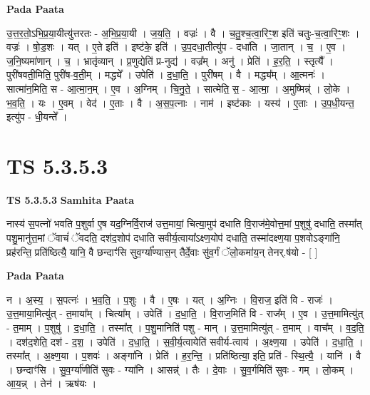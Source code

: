 \documentclass[17pt]{extarticle}
\begin{document}
\textbf{Pada Paata} \newline

उ॒त्त॒र॒तो॒ऽभि॒प्र॒या॒यीत्यु॑त्तरतः - अ॒भि॒प्र॒या॒यी । ज॒य॒ति॒ । वज्रः॑ । वै । च॒तु॒श्च॒त्वा॒रिꣳ॒॒श इति॑ चतुः-च॒त्वा॒रिꣳ॒॒शः । वज्रः॑ । षो॒ड॒शः । यत् । ए॒ते इति॑ । इष्ट॑के॒ इति॑ । उ॒प॒दधा॒तीत्यु॑प - दधा॑ति । जा॒तान् । च॒ । ए॒व । ज॒नि॒ष्यमा॑णान् । च॒ । भ्रातृ॑व्यान् । प्र॒णुद्येति॑ प्र-नुद्य॑ । वज्र᳚म् । अनु॑ । प्रेति॑ । ह॒र॒ति॒ । स्तृत्यै᳚ । पुरी॑षवती॒मिति॒ पुरी॑ष-व॒ती॒म् । मद्ध्ये᳚ । उपेति॑ । द॒धा॒ति॒ । पुरी॑षम् । वै । मद्ध्य᳚म् । आ॒त्मनः॑ । सात्मा॑न॒मिति॒ स - आ॒त्मा॒न॒म् । ए॒व । अ॒ग्निम् । चि॒नु॒ते॒ । सात्मेति॒ स॒ - आ॒त्मा॒ । अ॒मुष्मिन्न्॑ । लो॒के । भ॒व॒ति॒ । यः । ए॒वम् । वेद॑ । ए॒ताः । वै । अ॒स॒प॒त्नाः । नाम॑ । इष्ट॑काः । यस्य॑ । ए॒ताः । उ॒प॒धी॒यन्त॒ इत्यु॑प - धी॒यन्ते᳚ ।  \newline




\section*{ TS 5.3.5.3 }

\textbf{TS 5.3.5.3 } \newline
\textbf{Samhita Paata} \newline

नास्य॑ स॒पत्नो॑ भवति प॒शुर्वा ए॒ष यद॒ग्निर्वि॒राज॑ उत्त॒मायां॒ चित्या॒मुप॑ दधाति वि॒राज॑मे॒वोत्त॒मां प॒शुषु॑ दधाति॒ तस्मा᳚त् पशु॒मानु॑त्त॒मां ॅवाचं॑ ॅवदति॒ दश॑द॒शोप॑ दधाति सवीर्य॒त्वाया᳚ऽक्ष्ण॒योप॑ दधाति॒ तस्मा॑दक्ष्ण॒या प॒शवोऽङ्गा॑नि॒ प्रह॑रन्ति॒ प्रति॑ष्ठित्यै॒ यानि॒ वै छन्दाꣳ॑सि सुव॒र्ग्या᳚ण्यास॒न् तैर्दे॒वाः सु॑व॒र्गं ॅलो॒कमा॑य॒न् तेनर्.ष॑यो - [  ] \newline

\textbf{Pada Paata} \newline

न । अ॒स्य॒ । स॒पत्नः॑ । भ॒व॒ति॒ । प॒शुः । वै । ए॒षः । यत् । अ॒ग्निः । वि॒राज॒ इति॑ वि - राजः॑ । उ॒त्त॒माया॒मित्यु॑त् - त॒माया᳚म् । चित्या᳚म् । उपेति॑ । द॒धा॒ति॒ । वि॒राज॒मिति॑ वि - राज᳚म् । ए॒व । उ॒त्त॒मामित्यु॑त् - त॒माम् । प॒शुषु॑ । द॒धा॒ति॒ । तस्मा᳚त् । प॒शु॒मानिति॑ पशु - मान् । उ॒त्त॒मामित्यु॑त् - त॒माम् । वाच᳚म् । व॒द॒ति॒ । दश॑द॒शेति॒ दश॑ - द॒श॒ । उपेति॑ । द॒धा॒ति॒ । स॒वी॒र्य॒त्वायेति॑ सवीर्य-त्वाय॑ । अ॒क्ष्ण॒या । उपेति॑ । द॒धा॒ति॒ । तस्मा᳚त् । अ॒क्ष्ण॒या । प॒शवः॑ । अङ्गा॑नि । प्रेति॑ । ह॒र॒न्ति॒ । प्रति॑ष्ठित्या॒ इति॒ प्रति॑ - स्थि॒त्यै॒ । यानि॑ । वै । छन्दाꣳ॑सि । सु॒व॒र्ग्या॑णीति॑ सुवः - ग्या॑नि । आसन्न्॑ । तैः । दे॒वाः । सु॒व॒र्गमिति॑ सुवः - गम् । लो॒कम् । आ॒य॒न्न् । तेन॑ । ऋष॑यः ।  \newline
\end{document}
